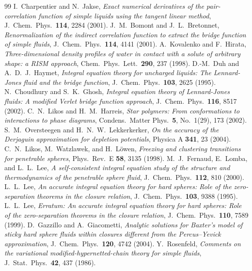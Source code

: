 \documentclass[11pt,a4paper]{article}
\begin{document}
\begin{thebibliography}{99}
I.~Charpentier and N.~Jakse,
\emph{Exact numerical derivatives of the pair-correlation function of simple
liquids using the tangent linear method},
J.\ Chem.\ Phys.\ \textbf{114}, 2284 (2001).
J.~M.~Bomont and J.~L.~Bretonnet,
\emph{Renormalization of the indirect correlation function to extract the
bridge function of simple fluids},
J.\ Chem.\ Phys.\ \textbf{114}, 4141 (2001).
A.~Kovalenko and F.~Hirata,
\emph{Three-dimensional density profiles of water in contact with a solute
of arbitrary shape: a RISM approach},
Chem.\ Phys.\ Lett.\ \textbf{290}, 237 (1998).
D.-M.~Duh and A.~D.~J.~Haymet,
\emph{Integral equation theory for uncharged liquids: The Lennard-Jones
fluid and the bridge function},
J.\ Chem.\ Phys.\ \textbf{103}, 2625 (1995).
N.~Choudhury and S.~K.~Ghosh,
\emph{Integral equation theory of Lennard-Jones fluids: A modified Verlet
bridge function approach},
J.\ Chem.\ Phys.\ \textbf{116}, 8517 (2002).
C.~N.~Likos and H.~M.~Harreis,
\emph{Star polymers: From conformations to interactions to phase diagrams},
Condens.\ Matter Phys.\ \textbf{5}, No.~1(29), 173 (2002).
S.~M.~Oversteegen and H.~N.~W.~Lekkerkerker,
\emph{On the accuracy of the Derjaguin approximation for depletion
potentials},
Physica A \textbf{341}, 23 (2004).
C.~N.~Likos, M.~Watzlawek, and H.~L\"owen,
\emph{Freezing and clustering transitions for penetrable spheres},
Phys.\ Rev.\ E \textbf{58}, 3135 (1998).
M.~J.~Fernaud, E.~Lomba, and L.~L.~Lee,
\emph{A self-consistent integral equation study of the structure and
thermodynamics of the penetrable sphere fluid},
J.\ Chem.\ Phys.\ \textbf{112}, 810 (2000).
L.~L.~Lee,
\emph{An accurate integral equation theory for hard spheres: Role of the
zero-separation theorems in the closure relation},
J.\ Chem.\ Phys.\ \textbf{103}, 9388 (1995).
L.~L.~Lee,
\emph{Erratum: An accurate integral equation theory for hard spheres: Role
of the zero-separation theorems in the closure relation},
J.\ Chem.\ Phys.\ \textbf{110}, 7589 (1999).
D.~Gazzillo and A.~Giacometti,
\emph{Analytic solutions for Baxter's model of sticky hard sphere fluids
within closures different from the Percus--Yevick approximation},
J.\ Chem.\ Phys.\ \textbf{120}, 4742 (2004).
Y.~Rosenfeld,
\emph{Comments on the variational modified-hypernetted-chain theory for
simple fluids},
J.\ Stat.\ Phys.\ \textbf{42}, 437 (1986).

\end{thebibliography}
\end{document}
